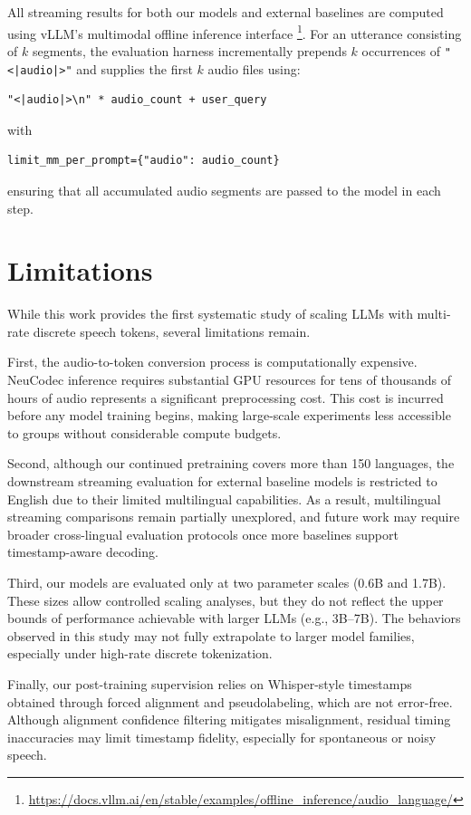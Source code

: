 \documentclass{article}
\begin{document}
All streaming results for both our models and external baselines are computed using 
vLLM's multimodal offline inference interface \footnote{ \url{https://docs.vllm.ai/en/stable/examples/offline_inference/audio_language/}}. For an utterance consisting of $k$ segments, the 
evaluation harness incrementally prepends $k$ occurrences of \texttt{"<|audio|>"} and 
supplies the first $k$ audio files using:
\begin{verbatim}
"<|audio|>\n" * audio_count + user_query
\end{verbatim}
with 
\begin{verbatim}
limit_mm_per_prompt={"audio": audio_count}
\end{verbatim}
ensuring that all accumulated audio segments are passed to the model in each step.

\section{Limitations}

While this work provides the first systematic study of scaling LLMs with multi-rate discrete
speech tokens, several limitations remain.

First, the audio-to-token conversion process is computationally expensive. NeuCodec inference 
requires substantial GPU resources for tens of thousands of hours of audio represents a significant preprocessing cost. 
This cost is incurred before any model training begins, making large-scale experiments 
less accessible to groups without considerable compute budgets.

Second, although our continued pretraining covers more than 150 languages, the downstream 
streaming evaluation for external baseline models is restricted to English due to their 
limited multilingual capabilities. As a result, multilingual streaming comparisons remain 
partially unexplored, and future work may require broader cross-lingual evaluation protocols 
once more baselines support timestamp-aware decoding.

Third, our models are evaluated only at two parameter scales (0.6B and 1.7B). These sizes 
allow controlled scaling analyses, but they do not reflect the upper bounds of performance 
achievable with larger LLMs (e.g., 3B--7B). The behaviors observed in this study may not 
fully extrapolate to larger model families, especially under high-rate discrete tokenization.

Finally, our post-training supervision relies on Whisper-style timestamps obtained through 
forced alignment and pseudolabeling, which are not error-free. Although alignment confidence 
filtering mitigates misalignment, residual timing inaccuracies may limit timestamp fidelity, 
especially for spontaneous or noisy speech.
\end{document}

